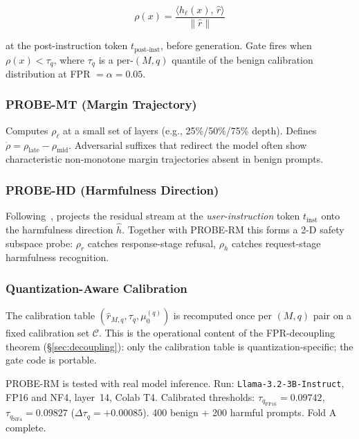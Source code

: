 \documentclass[11pt,a4paper]{article}
\newcommand{\rhat}{\hat{r}}
\newcommand{\hhat}{\hat{h}}
\newcommand{\tauq}{\tau_q}
\begin{document}
\begin{equation}
  \rho(x) = \frac{\langle h_\ell(x),\, \rhat \rangle}{\|\rhat\|}
  \label{eq:margin}
\end{equation}

at the post-instruction token $t_\text{post-inst}$, before generation.
Gate fires when $\rho(x) < \tauq$, where $\tauq$ is a per-$(M, q)$ quantile of the
benign calibration distribution at FPR $= \alpha = 0.05$.

\subsubsection*{PROBE-MT (Margin Trajectory)}

Computes $\rho_\ell$ at a small set of layers (e.g., 25\%/50\%/75\% depth).
Defines $\dot\rho = \rho_\text{late} - \rho_\text{mid}$.
Adversarial suffixes that redirect the model often show characteristic non-monotone
margin trajectories absent in benign prompts.

\subsubsection*{PROBE-HD (Harmfulness Direction)}

Following~\citet{zhao2025refusal}, projects the residual stream at the
\emph{user-instruction} token $t_\text{inst}$ onto the harmfulness direction $\hhat$.
Together with PROBE-RM this forms a 2-D safety subspace probe: $\rho_r$ catches
response-stage refusal, $\rho_h$ catches request-stage harmfulness recognition.

\subsubsection*{Quantization-Aware Calibration}

The calibration table $(\rhat_{M,q}, \tauq, \mu_0^{(q)})$ is recomputed once per
$(M, q)$ pair on a fixed calibration set $\mathcal{C}$.
This is the operational content of the FPR-decoupling theorem
(\S\ref{sec:decoupling}): only the calibration table is quantization-specific; the
gate code is portable.

\begin{testedbox}
PROBE-RM is tested with real model inference.
Run: \texttt{Llama-3.2-3B-Instruct}, FP16 and NF4, layer~14, Colab T4.
Calibrated thresholds: $\tauq_\text{FP16} = 0.09742$, $\tauq_\text{NF4} = 0.09827$
($\Delta\tauq = +0.00085$). 400 benign + 200 harmful prompts. Fold A complete.
\end{testedbox}
\end{document}
